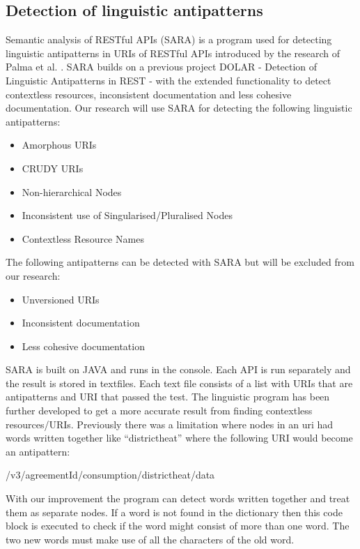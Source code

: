 \documentclass[a4paper,12pt]{article}
\begin{document}
\subsection{Detection of linguistic antipatterns}
Semantic analysis of RESTful APIs (SARA) is a program used for detecting linguistic antipatterns in URIs of RESTful APIs introduced by the research of Palma et al. \cite{linguistic}. SARA builds on a previous project DOLAR - Detection of Linguistic Antipatterns in REST - with the extended functionality to detect contextless resources, inconsistent documentation and less cohesive documentation.
Our research will use SARA for detecting the following linguistic antipatterns:
\begin{itemize}
\item Amorphous URIs
\item CRUDY URIs
\item Non-hierarchical Nodes
\item Inconsistent use of Singularised/Pluralised Nodes
\item Contextless Resource Names
\end{itemize}

The following antipatterns can be detected with SARA but will be excluded from our research:
\begin{itemize}
\item Unversioned URIs
\item Inconsistent documentation
\item Less cohesive documentation
\end{itemize}

SARA is built on JAVA and runs in the console. Each API is run separately and the result is stored in textfiles. Each text file consists of a list with URIs that are antipatterns and URI that passed the test.
The linguistic program has been further developed to get a more accurate result from finding contextless resources/URIs. Previously there was a limitation where nodes in an uri had words written together like “districtheat” where the following URI would become an antipattern: 

/v3/{agreementId}/consumption/districtheat/data

With our improvement the program can detect words written together and treat them as separate nodes. If a word is not found in the dictionary then this code block is executed to check if the word might consist of more than one word. The two new words must make use of all the characters of the old word.
\end{document}
